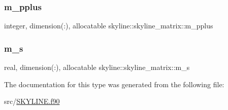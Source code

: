 \subsubsection{\texorpdfstring{m\+\_\+pplus}{m\_pplus}}
{\footnotesize\ttfamily integer, dimension(\+:), allocatable skyline\+::skyline\+\_\+matrix\+::m\+\_\+pplus}

\mbox{\label{structskyline_1_1skyline__matrix_ad8c333b80461be7faf047a603edd445a}} 
\subsubsection{\texorpdfstring{m\+\_\+s}{m\_s}}
{\footnotesize\ttfamily real, dimension(\+:), allocatable skyline\+::skyline\+\_\+matrix\+::m\+\_\+s}



The documentation for this type was generated from the following file\+:\begin{DoxyCompactItemize}
\item 
src/\hyperlink{_s_k_y_l_i_n_e_8f90}{S\+K\+Y\+L\+I\+N\+E.\+f90}\end{DoxyCompactItemize}
